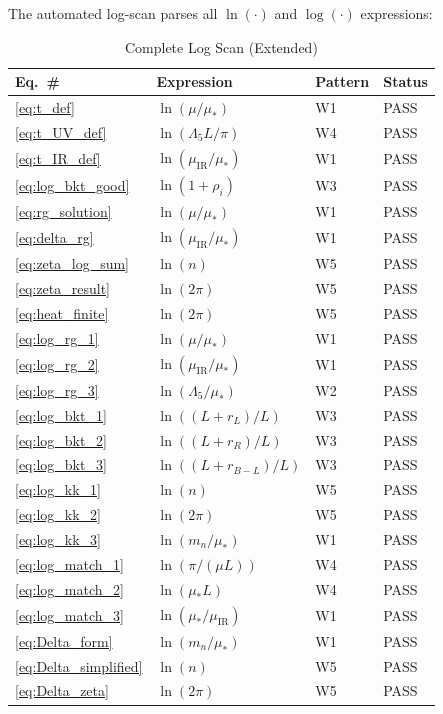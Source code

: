 \documentclass[11pt,a4paper]{article}
\theoremstyle{definition}
\begin{document}
The automated log-scan parses all $\ln(\cdot)$ and $\log(\cdot)$ expressions:

\begin{table}[h]
\centering
\caption{Complete Log Scan (Extended)}
\label{tab:log_scan_extended}
\begin{tabular}{@{}llll@{}}
\toprule
\textbf{Eq.~\#} & \textbf{Expression} & \textbf{Pattern} & \textbf{Status} \\
\midrule
\ref{eq:t_def} & $\ln(\mu/\mu_*)$ & W1 & PASS \\
\ref{eq:t_UV_def} & $\ln(\Lambda_5 L/\pi)$ & W4 & PASS \\
\ref{eq:t_IR_def} & $\ln(\mu_{\text{IR}}/\mu_*)$ & W1 & PASS \\
\ref{eq:log_bkt_good} & $\ln(1 + \rho_i)$ & W3 & PASS \\
\ref{eq:rg_solution} & $\ln(\mu/\mu_*)$ & W1 & PASS \\
\ref{eq:delta_rg} & $\ln(\mu_{\text{IR}}/\mu_*)$ & W1 & PASS \\
\ref{eq:zeta_log_sum} & $\ln(n)$ & W5 & PASS \\
\ref{eq:zeta_result} & $\ln(2\pi)$ & W5 & PASS \\
\ref{eq:heat_finite} & $\ln(2\pi)$ & W5 & PASS \\
\ref{eq:log_rg_1} & $\ln(\mu/\mu_*)$ & W1 & PASS \\
\ref{eq:log_rg_2} & $\ln(\mu_{\text{IR}}/\mu_*)$ & W1 & PASS \\
\ref{eq:log_rg_3} & $\ln(\Lambda_5/\mu_*)$ & W2 & PASS \\
\ref{eq:log_bkt_1} & $\ln((L+r_L)/L)$ & W3 & PASS \\
\ref{eq:log_bkt_2} & $\ln((L+r_R)/L)$ & W3 & PASS \\
\ref{eq:log_bkt_3} & $\ln((L+r_{B-L})/L)$ & W3 & PASS \\
\ref{eq:log_kk_1} & $\ln(n)$ & W5 & PASS \\
\ref{eq:log_kk_2} & $\ln(2\pi)$ & W5 & PASS \\
\ref{eq:log_kk_3} & $\ln(m_n/\mu_*)$ & W1 & PASS \\
\ref{eq:log_match_1} & $\ln(\pi/(\mu L))$ & W4 & PASS \\
\ref{eq:log_match_2} & $\ln(\mu_* L)$ & W4 & PASS \\
\ref{eq:log_match_3} & $\ln(\mu_*/\mu_{\text{IR}})$ & W1 & PASS \\
\ref{eq:Delta_form} & $\ln(m_n/\mu_*)$ & W1 & PASS \\
\ref{eq:Delta_simplified} & $\ln(n)$ & W5 & PASS \\
\ref{eq:Delta_zeta} & $\ln(2\pi)$ & W5 & PASS \\
\bottomrule
\end{tabular}
\end{table}
\end{document}
